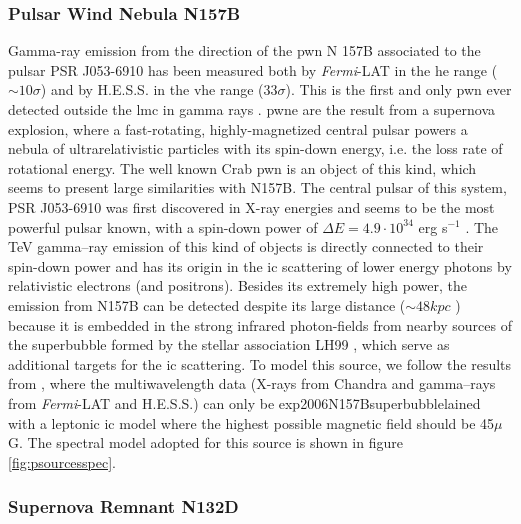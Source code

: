 \documentclass{article}
\begin{document}
    \subsubsection{Pulsar Wind Nebula N157B}
    
    Gamma-ray emission from the direction of the \gls{pwn} N 157B associated to the pulsar  PSR J053-6910 has been measured both by \textit{Fermi}-LAT in the \gls{he} range ($\sim 10 \sigma$) and by H.E.S.S. in the \gls{vhe} range ($33 \sigma$). This is the first and only \gls{pwn} ever detected outside the \gls{lmc} in gamma rays \cite{2012HESSN157B}. \gls{pwne} are the result from  a supernova explosion, where a fast-rotating, highly-magnetized central pulsar powers a nebula of ultrarelativistic particles with its spin-down energy, i.e. the loss rate of rotational energy. The well known Crab \gls{pwn} is an object of this kind, which seems to present large similarities with N157B. The central pulsar of this system, PSR J053-6910 was first discovered in X-ray energies and seems to be the most powerful pulsar known, with a spin-down power of $\Delta E = 4.9 \cdot 10^{34} $ erg s$^{-1}$ \cite{1998PulsarN157B}. The TeV gamma--ray emission of this kind of objects is directly connected to their spin-down power and has its origin in the \gls{ic} scattering of lower energy photons by relativistic electrons (and positrons). Besides its extremely high power, the emission from N157B can be detected despite its large distance ($\sim 48 kpc$ \cite{2006N157Bdistance}) because it is embedded in the strong infrared photon-fields from nearby sources of the superbubble formed by the stellar association LH99 \cite{}, which serve as additional targets for the \gls{ic} scattering.
    To model this source, we follow the results from \cite{2015HESSTeVLMC}, where the multiwavelength data (X-rays from Chandra \cite{2001ChandraN157B} and gamma--rays from \textit{Fermi}-LAT and H.E.S.S.) can only be exp2006N157Bsuperbubblelained with a leptonic \gls{ic} model where the highest possible magnetic field should be 45$\mu$ G. The  spectral model adopted for this source is shown in figure \ref{fig:psourcesspec}. 
    
    \subsubsection{Supernova Remnant N132D}
    
\end{document}
